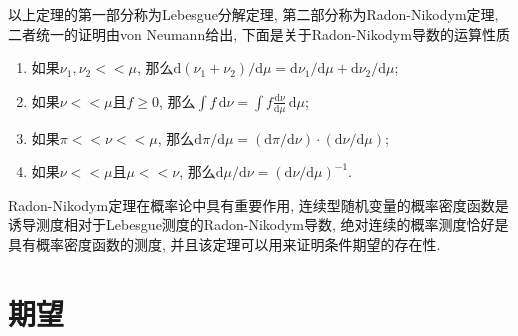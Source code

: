 \documentclass[cn, 12pt, math=mtpro2, bibstyle=apa, blue, twocol]{elegantbook}
\begin{document}
以上定理的第一部分称为Lebesgue分解定理, 第二部分称为Radon-Nikodym定理, 二者统一的证明由von Neumann给出, 下面是关于Radon-Nikodym导数的运算性质
\begin{enumerate}[label=(\arabic*)]
  \item 如果$\nu_1,\nu_2<<\mu$, 那么$\text{d}(\nu_1+\nu_2)/\text{d}\mu=\text{d}\nu_1/\text{d}\mu+\text{d}\nu_2/\text{d}\mu$;
  \item 如果$\nu<<\mu$且$f\ge0$, 那么$\int f\,\text{d}\nu=\int f\frac{\text{d}\nu}{\text{d}\mu}\,\text{d}\mu$;
  \item 如果$\pi<<\nu<<\mu$, 那么$\text{d}\pi/\text{d}\mu=(\text{d}\pi/\text{d}\nu)\cdot(\text{d}\nu/\text{d}\mu)$;
  \item 如果$\nu<<\mu$且$\mu<<\nu$, 那么$\text{d}\mu/\text{d}\nu=(\text{d}\nu/\text{d}\mu)^{-1}$.
  \end{enumerate}


Radon-Nikodym定理在概率论中具有重要作用, 连续型随机变量的概率密度函数是诱导测度相对于Lebesgue测度的Radon-Nikodym导数, 绝对连续的概率测度恰好是具有概率密度函数的测度, 并且该定理可以用来证明条件期望的存在性.


\section{期望}
\end{document}
